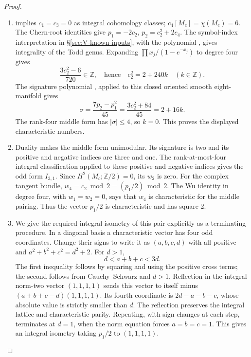 \begin{proof}
\begin{enumerate}[label={$\langle1\rangle$\arabic*.}]
\item {} implies $c_1=c_3=0$ as integral cohomology classes;
$c_4[M_c]=\chi(M_c)=6$.  The Chern-root identities give
$p_1=-2c_2$, $p_2=c_2^2+2c_4$.
The symbol-index interpretation in \S\ref{sec:V-known-inputs},
with the polynomial \cite[equation (1.2), p.~3]{ffEsoleKang},
gives integrality of the Todd genus. Expanding
$\prod x_j/(1-e^{-x_j})$ to degree four gives
\[
\frac{3c_2^2-6}{720}\in\mathbb Z,
\quad\text{hence}\quad c_2^2=2+240k\quad(k\in\mathbb Z).
\]
The signature polynomial \cite[equation (1.4), p.~4]{ffEsoleKang}, applied to
this closed oriented smooth eight-manifold gives
\[
\sigma=\frac{7p_2-p_1^2}{45}
      =\frac{3c_2^2+84}{45}=2+16k.
\]
The rank-four middle form has $|\sigma|\leq4$, so $k=0$.
This proves the displayed characteristic numbers.

\item Duality makes the middle form unimodular.  Its signature is two and
its positive and negative indices are three and one.  The rank-at-most-four integral classification
\cite[Theorem 2.2.1, p.~61]{ffPetersSterk} applied to these
positive and negative indices gives the odd form \(I_{3,1}\).
Since $H^2(M_c;\mathbb Z/2)=0$, its $w_2$ is zero.
For the complex tangent bundle,
$w_4=c_2\bmod2=(p_1/2)\bmod2$.
The Wu identity in degree four, with $w_1=w_2=0$, says that $w_4$ is
characteristic for the middle pairing.  Thus the vector $p_1/2$ is
characteristic and has square $2$.

\item We give the required integral isometry of this pair explicitly as
a terminating procedure.  In a diagonal basis a characteristic vector
has four odd coordinates.  Change their signs to write it as
$(a,b,c,d)$ with all positive and
$a^2+b^2+c^2=d^2+2$.
For $d>1$,
\[
d<a+b+c<3d.
\]
The first inequality follows by squaring and using the positive cross
terms; the second follows from Cauchy--Schwarz and $d>1$.
Reflection in the integral norm-two vector $(1,1,1,1)$ sends this
vector to itself minus $(a+b+c-d)(1,1,1,1)$.
Its fourth coordinate is $2d-a-b-c$, whose absolute value is strictly
smaller than $d$.  The reflection preserves the integral lattice and
characteristic parity.  Repeating, with sign changes at each step,
terminates at $d=1$, when the norm equation forces $a=b=c=1$.
This gives an integral isometry taking $p_1/2$ to $(1,1,1,1)$.

\end{enumerate}
\end{proof}




